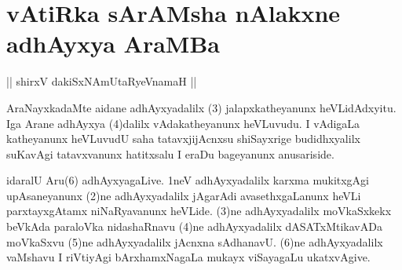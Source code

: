 \section*{vAtiRka sArAMsha nAlakxne adhAyxya AraMBa}

\begin{center}%
|| shirxV dakiSxNAmUtaRyeVnamaH ||
\end{center}


\begin{artha}
AraNayxkadaMte aidane adhAyxyadalilx (3) jalapxkatheyanunx heVLidAdxyitu. Iga Arane adhAyxya (4)dalilx vAdakatheyanunx heVLuvudu. I vAdigaLa katheyanunx heVLuvudU saha tatavxjijAcnxsu shiSayxrige budidhxyalilx suKavAgi tatavxvanunx hatitxsalu I eraDu bageyanunx anusariside. 
\end{artha}


\begin{artha}
idaralU Aru(6) adhAyxyagaLive. 1neV adhAyxyadalilx karxma mukitxgAgi upAsaneyanunx (2)ne adhAyxyadalilx jAgarAdi avasethxgaLanunx heVLi parxtayxgAtamx niNaRyavanunx heVLide. (3)ne adhAyxyadalilx moVkaSxkekx beVkAda paraloVka nidashaRnavu (4)ne adhAyxyadalilx dASATxMtikavADa moVkaSxvu (5)ne adhAyxyadalilx jAcnxna sAdhanavU. (6)ne adhAyxyadalilx vaMshavu I riVtiyAgi bArxhamxNagaLa mukayx viSayagaLu ukatxvAgive. 
\end{artha}




